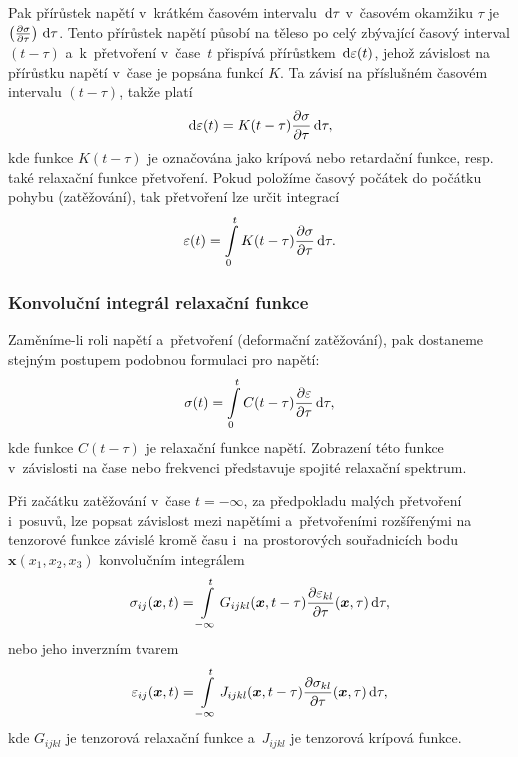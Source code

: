 Pak přírůstek napětí v~krátkém časovém intervalu $\,\mathrm{d} \tau$ v~časovém okamžiku $\tau$ je $\left(\frac{\partial \sigma}{\partial \tau}\right) \,\mathrm{d} \tau$.
Tento přírůstek napětí působí na těleso po celý zbývající časový interval $(t - \tau)$ a~k~přetvoření v~čase~$t$ přispívá přírůstkem $\,\mathrm{d} \varepsilon(t)$, jehož závislost na přírůstku napětí v~čase je popsána funkcí $K$. Ta závisí na příslušném časovém intervalu $(t - \tau)$, takže platí
\begin{equation}
	\,\mathrm{d} \varepsilon(t) = K(t - \tau) \frac{\partial \sigma}{\partial \tau} \,\mathrm{d} \tau,
\end{equation}
kde funkce $K(t - \tau)$ je označována jako krípová nebo retardační funkce, resp. také relaxační funkce přetvoření.
Pokud položíme časový počátek do počátku pohybu (zatěžování), tak přetvoření lze určit integrací
\begin{equation}
	\varepsilon(t) = \int\limits_0^t K(t - \tau) \frac{\partial \sigma}{\partial \tau} \,\mathrm{d} \tau.
\end{equation}

\subsubsection{Konvoluční integrál relaxační funkce}
Zaměníme-li roli napětí a~přetvoření (deformační zatěžování), pak dostaneme stejným postupem podobnou formulaci pro napětí:
\begin{equation}
	\sigma(t) = \int\limits_0^t C(t - \tau) \frac{\partial \varepsilon}{\partial \tau} \,\mathrm{d} \tau,
\end{equation}
kde funkce $C(t - \tau)$ je relaxační funkce napětí. Zobrazení této funkce v~závislosti na čase nebo frekvenci představuje spojité relaxační spektrum.

Při začátku zatěžování v~čase $t = -\infty$, za předpokladu malých přetvoření i~posuvů, lze popsat závislost mezi napětími a~přetvořeními rozšířenými na tenzorové funkce závislé kromě času i~na prostorových souřadnicích bodu $\bm{x}(x_1, x_2, x_3)$ konvolučním integrálem 
\begin{equation}
	\sigma_{ij}(\bm{x}, t) = \int\limits_{-\infty}^t G_{ijkl}(\bm{x}, t - \tau) \frac{\partial \varepsilon_{kl}}{\partial \tau} (\bm{x}, \tau) \,\mathrm{d} \tau,
\end{equation}
nebo jeho inverzním tvarem
\begin{equation}
	\varepsilon_{ij}(\bm{x}, t) = \int\limits_{-\infty}^t J_{ijkl}(\bm{x}, t - \tau) \frac{\partial \sigma_{kl}}{\partial \tau} (\bm{x}, \tau) \,\mathrm{d} \tau,
\end{equation}
kde $G_{ijkl}$ je tenzorová relaxační funkce a~$J_{ijkl}$ je tenzorová krípová funkce.

